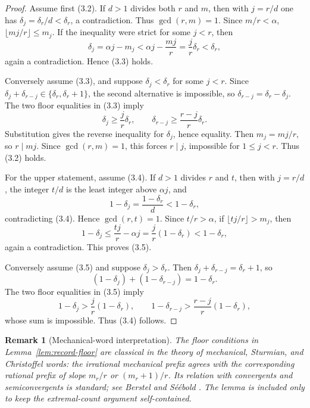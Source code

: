 \documentclass[11pt]{article}
\newtheorem{remark}[theorem]{Remark}
\begin{document}
\begin{proof}
Assume first (3.2). If \(d>1\) divides both \(r\) and \(m\), then with
\(j=r/d\) one has \(\delta_j=\delta_r/d<\delta_r\), a contradiction.
Thus \(\gcd(r,m)=1\). Since \(m/r<\alpha\),
\(\lfloor mj/r\rfloor\leq m_j\). If the inequality were strict for some
\(j<r\), then
\[
 \delta_j=\alpha j-m_j
 <\alpha j-\frac{mj}{r}
 =\frac{j}{r}\delta_r<\delta_r,
\]
again a contradiction. Hence (3.3) holds.

Conversely assume (3.3), and suppose \(\delta_j<\delta_r\) for some
\(j<r\). Since
\(\delta_j+\delta_{r-j}\in\{\delta_r,\delta_r+1\}\), the second
alternative is impossible, so
\(\delta_{r-j}=\delta_r-\delta_j\). The two floor equalities in (3.3)
imply
\[
 \delta_j\geq\frac{j}{r}\delta_r,
 \qquad
 \delta_{r-j}\geq\frac{r-j}{r}\delta_r.
\]
Substitution gives the reverse inequality for \(\delta_j\), hence equality.
Then \(m_j=mj/r\), so \(r\mid mj\). Since \(\gcd(r,m)=1\), this forces
\(r\mid j\), impossible for \(1\leq j<r\). Thus (3.2) holds.

For the upper statement, assume (3.4). If \(d>1\) divides \(r\) and
\(t\), then with \(j=r/d\), the integer \(t/d\) is the least integer
above \(\alpha j\), and
\[
 1-\delta_j=\frac{1-\delta_r}{d}<1-\delta_r,
\]
contradicting (3.4). Hence \(\gcd(r,t)=1\). Since \(t/r>\alpha\), if
\(\lfloor tj/r\rfloor>m_j\), then
\[
 1-\delta_j
 \leq\frac{tj}{r}-\alpha j
 =\frac{j}{r}(1-\delta_r)<1-\delta_r,
\]
again a contradiction. This proves (3.5).

Conversely assume (3.5) and suppose \(\delta_j>\delta_r\). Then
\(\delta_j+\delta_{r-j}=\delta_r+1\), so
\[
 (1-\delta_j)+(1-\delta_{r-j})=1-\delta_r.
\]
The two floor equalities in (3.5) imply
\[
 1-\delta_j>\frac{j}{r}(1-\delta_r),
 \qquad
 1-\delta_{r-j}>\frac{r-j}{r}(1-\delta_r),
\]
whose sum is impossible. Thus (3.4) follows.
\end{proof}

\begin{remark}[Mechanical-word interpretation]
The floor conditions in Lemma~\ref{lem:record-floor} are classical in
the theory of mechanical, Sturmian, and Christoffel words: the irrational
mechanical prefix agrees with the corresponding rational prefix of slope
\(m_r/r\) or \((m_r+1)/r\). Its relation with convergents and
semiconvergents is standard; see Berstel and S\'e\'ebold
\cite{BerstelSeebold02}. The lemma is included only to keep the
extremal-count argument self-contained.
\end{remark}
\end{document}
